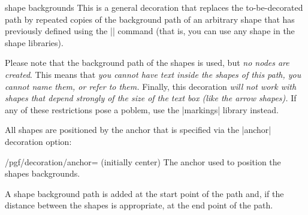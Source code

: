 \begin{decoration}{shape backgrounds}
  This is a general decoration that replaces the to-be-decorated path by repeated
  copies of the background path of an arbitrary shape that has
  previously defined using the |\pgfdeclareshape| command (that is,
  you can use any shape in the shape libraries).

  Please note that the background path of the shapes is used, but
  \emph{no nodes are created}. This means that \emph{you cannot have
    text inside the shapes of this path, you cannot name them, or
    refer to them.} Finally, this decoration \emph{will not work with
    shapes that depend  strongly of the size of the text box (like the
    arrow shapes).}  If any of these restrictions pose a poblem, use
  the |markings| library instead.

\begin{codeexample}[]
\end{codeexample}

\begin{codeexample}[]
\end{codeexample}

  All shapes are positioned by the anchor that is specified via the
  |anchor| decoration option:

  \begin{key}{/pgf/decoration/anchor= (initially center)}
    The anchor used to position the shapes backgrounds.
  \end{key}

  A shape background path is added at the start point of the path and,
  if the distance between the shapes is appropriate, at the end point
  of the path. 
	

\end{decoration}
